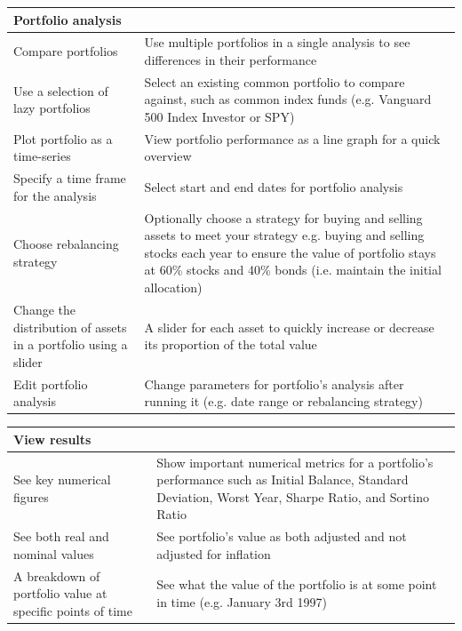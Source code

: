 \documentclass[main.tex]{subfiles}
\begin{document}
{
\setlength{\tabcolsep}{30pt}
\renewcommand{\arraystretch}{2}
\centering
{}
\begin{tabularx}{\linewidth}{|X|X|}
\hline
 \textbf{Portfolio analysis}  &  \\
 \hline
 Compare portfolios & Use multiple portfolios in a single analysis to see differences in their performance \\
\hline
Use a selection of lazy portfolios & Select an existing common portfolio to compare against, such as common index funds (e.g. Vanguard 500 Index Investor or SPY) \\
\hline
Plot portfolio as a time-series & View portfolio performance as a line graph for a quick overview \\
\hline
Specify a time frame for the analysis & Select start and end dates for portfolio analysis \\
\hline
Choose rebalancing strategy & Optionally choose a strategy for buying and selling assets to meet your strategy e.g. buying and selling stocks each year to ensure the value of portfolio stays at 60\% stocks and 40\% bonds (i.e. maintain the initial allocation) \\
\hline
Change the distribution of assets in a portfolio using a slider & A slider for each asset to quickly increase or decrease its proportion of the total value \\
\hline
Edit portfolio analysis & Change parameters for portfolio's analysis after running it (e.g. date range or rebalancing strategy) \\
\hline
\end{tabularx}
}

\vspace{0.5cm}

{
\setlength{\tabcolsep}{30pt}
\renewcommand{\arraystretch}{2}
\centering
{}
\begin{tabularx}{\linewidth}{|X|X|}
\hline
 \textbf{View results}  &  \\
 \hline
 See key numerical figures & Show important numerical metrics for a portfolio's performance such as Initial Balance, Standard Deviation, Worst Year, Sharpe Ratio, and Sortino Ratio \\
\hline
See both real and nominal values & See portfolio's value as both adjusted and not adjusted for inflation \\
\hline
A breakdown of portfolio value at specific points of time & See what the value of the portfolio is at some point in time (e.g. January 3rd 1997) \\
\hline
\end{tabularx}
}
\end{document}
